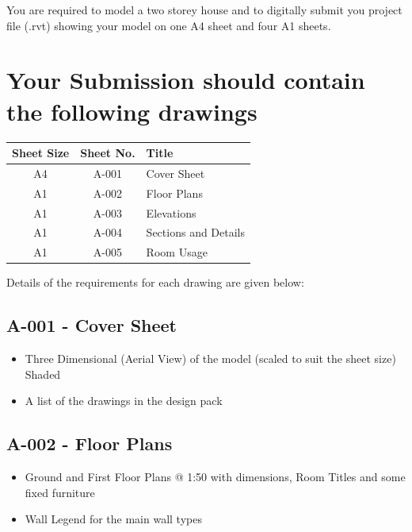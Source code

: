 \vspace{1cm}




You are required to model a two storey house and to digitally submit you project file (.rvt) showing your model on one A4 sheet and four A1 sheets.



\section*{Your Submission should contain the following drawings}



\begin{tabularx}{\textwidth}{ |c|c|X| }
	\hline
	\textbf{Sheet Size} & \textbf{Sheet No.} & \textbf{Title} \\
	\hline 
	A4  & A-001 & Cover Sheet \\
	A1  & A-002 & Floor Plans \\
	A1  & A-003 & Elevations \\
	A1  & A-004 & Sections and Details \\
	A1  & A-005 & Room Usage \\
	\hline
\end{tabularx}

Details of the requirements for each drawing are given below:\\

\subsection*{A-001 - Cover Sheet}
\begin{itemize}
	\item Three Dimensional (Aerial View) of the model (scaled to suit the sheet size) Shaded
	\item A list of the drawings in the design pack
\end{itemize}


\subsection*{A-002 - Floor Plans}
\begin{itemize}
	\item Ground and First Floor Plans @ 1:50 with dimensions, Room Titles and some fixed furniture
	\item Wall Legend for the main wall types
\end{itemize}



